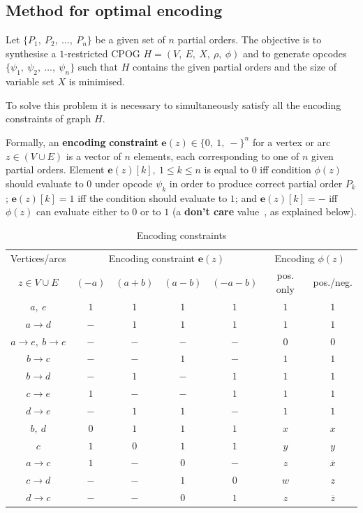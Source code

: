 \subsection{Method for optimal encoding\label{sec:Method-for-optimal}
}

Let $\{P_{1},\ P_{2},\ \dots,\ P_{n}\}$ be a given set of $n$ partial
orders. The objective is to synthesise a $1$-restricted CPOG $H=(V,\ E,\ X,\ \rho,\ \phi)$
and to generate opcodes $\{\psi_{1},\ \psi_{2},\ \dots,\ \psi_{n}\}$
such that $H$ contains the given partial orders and the size of variable
set $X$ is minimised.

To solve this problem it is necessary to simultaneously satisfy all
the encoding\emph{ }constraints of graph $H$.

Formally, an \textbf{encoding}\emph{ }\textbf{constraint} $\mathbf{e}(z)\in\{0,\ 1,\ -\}^{n}$
for a vertex or arc $z\in(V\cup E)$ is a vector of $n$ elements,
each corresponding to one of $n$ given partial orders. Element $\mathbf{e}(z)[k],\ 1\le k\le n$
is equal to $0$ iff condition $\phi(z)$ should evaluate to $0$
under opcode $\psi_{k}$ in order to produce correct partial order
$P_{k}$; $\mathbf{e}(z)[k]=1$ iff the condition should evaluate
to $1$; and $\mathbf{e}(z)[k]=-$ iff $\phi(z)$ can evaluate either
to $0$ or to $1$ (a \textbf{don't care} value~\cite{1994_de_micheli_book},
as explained below).

\begin{table}[h]
\begin{centering}
\begin{tabular}{|c|c|c|c|c|c|c|}
\hline 
Vertices/arcs & \multicolumn{4}{c|}{Encoding constraint $\mathbf{e}(z)$} & \multicolumn{2}{c|}{Encoding $\phi(z)$}\tabularnewline
\cline{2-7} 
\multicolumn{1}{|c|}{$z\in V\cup E$} & $(-a)$ & $(a+b)$ & $(a-b)$ & $(-a-b)$ & \multicolumn{1}{c|}{pos. only} & \multicolumn{1}{c|}{pos./neg.}\tabularnewline
\hline 
\hline 
$a,\ e$ & $1$ & $1$ & $1$ & $1$ & $1$ & $1$\tabularnewline
\hline 
$a\rightarrow d$ & $-$ & $1$ & $1$ & $1$ & $1$ & $1$\tabularnewline
\hline 
$a\rightarrow e,\ b\rightarrow e$ & $-$ & $-$ & $-$ & $-$ & $0$ & $0$\tabularnewline
\hline 
$b\rightarrow c$ & $-$ & $-$ & $1$ & $-$ & $1$ & $1$\tabularnewline
\hline 
$b\rightarrow d$ & $-$ & $1$ & $-$ & $1$ & $1$ & $1$\tabularnewline
\hline 
$c\rightarrow e$ & $1$ & $-$ & $-$ & $1$ & $1$ & $1$\tabularnewline
\hline 
$d\rightarrow e$ & $-$ & $1$ & $1$ & $-$ & $1$ & $1$\tabularnewline
\hline 
\hline 
$b,\ d$ & $0$ & $1$ & $1$ & $1$ & $x$ & $x$\tabularnewline
\hline 
$c$ & $1$ & $0$ & $1$ & $1$ & $y$ & $y$\tabularnewline
\hline 
$a\rightarrow c$ & $1$ & $-$ & $0$ & $-$ & $z$ & $\overline{x}$\tabularnewline
\hline 
$c\rightarrow d$ & $-$ & $-$ & $1$ & $0$ & $w$ & $z$\tabularnewline
\hline 
$d\rightarrow c$ & $-$ & $-$ & $0$ & $1$ & $z$ & $\overline{z}$\tabularnewline
\hline 
\end{tabular}

\par\end{centering}

\caption{Encoding constraints\label{tab:Encoding-contstraints}}
\end{table}


